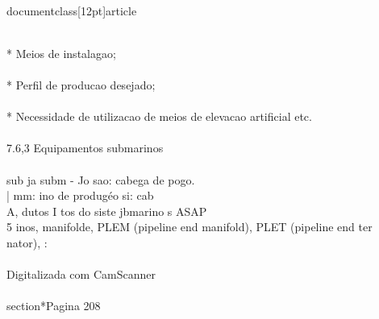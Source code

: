 \\documentclass[12pt]{article}
\begin{document}
\\
* Meios de instalagao;\\
\\
* Perfil de producao desejado;\\
\\
* Necessidade de utilizacao de meios de elevacao artificial etc.\\
\\
7.6,3 Equipamentos submarinos\\
\\
sub ja subm - Jo sao: cabega de pogo.\\
| mm: ino de produgéo si: cab\\
A, dutos I tos do siste jbmarino s ASAP\\
5 inos, manifolde, PLEM (pipeline end manifold), PLET (pipeline end ter\\
nator), :\\
\\
Digitalizada com CamScanner\\

\\section*{Pagina 208}
\end{document}
